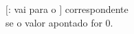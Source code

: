 \documentclass[preview]{standalone}
\begin{document}
$[$: vai para o $]$ correspondente\\se o valor apontado for 0.\\\\
\end{document}
